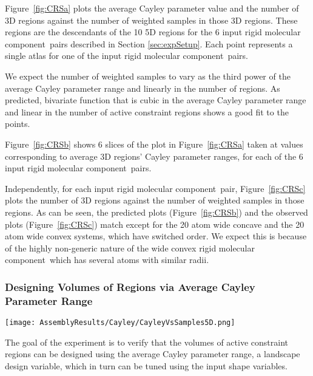 \documentclass[]{article}
\newcommand{\figref}[1]{Figure~\ref{#1}}
\newcommand{\rmc}{rigid molecular component}
\newcommand{\rahul}[1]{\color{black}{#1}\color{black}}
\begin{document}
\figref{fig:CRSa} plots the average Cayley parameter value and the number of 3D
regions against the number of weighted samples in those 3D regions. These
regions are the descendants of the 10 5D regions for the 6 input \rmc\ pairs
described in Section \ref{sec:expSetup}. Each point represents a single atlas
for one of the input \rmc\ pairs.

We expect the number of weighted samples to vary as the third power of the
average Cayley parameter range and linearly in the number of regions. As
predicted, \rahul{a } bivariate function that is cubic in the average Cayley parameter
range and linear in the number of active constraint regions shows a good fit to
the points.

\figref{fig:CRSb} shows 6 slices of the plot in \figref{fig:CRSa} taken at values 
corresponding to average 3D regions' Cayley parameter ranges, for each of the
6 input \rmc\ pairs.


Independently, for each input \rmc\ pair, \figref{fig:CRSc} plots the number
of 3D regions against the number of weighted samples in those regions.
As can be seen, the predicted plots (\figref{fig:CRSb}) and the
observed plots (\figref{fig:CRSc}) match except for the 20 atom wide concave and the
20 atom wide convex systems, which have switched order. We expect this is because
of the highly non-generic nature of the wide convex \rmc\ which has several
atoms with similar radii.

\subsubsection{Designing Volumes of Regions via Average Cayley Parameter Range}
\label{sec:results:DesignVolume}
\begin{figure*}[htpb]
\centering
\texttt{[image: AssemblyResults/Cayley/CayleyVsSamples5D.png]}
\caption{\scriptsize \textbf{Effect of the Average Cayley Parameter Range on Volume}: 
Each point of a single color represents one of the 10, 5D active constraint 
regions; each color represents one of the six input molecular pairs shown in
\figref{fig:inputMolecules}.
Trend lines fit a -degree polynomial curve
(see text in Section \ref{sec:results:DesignVolume}).
}
\label{fig:CayleyVsSamples}
\end{figure*}
The goal of the experiment is to verify that the volumes of active constraint
regions can be designed using the average Cayley parameter range, a landscape
design variable, which in turn can be tuned using the input shape variables.
\end{document}
